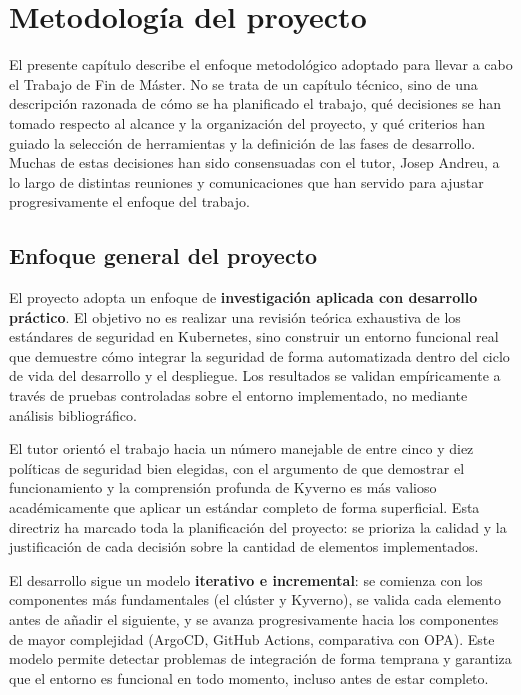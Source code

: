 \chapter{Metodología del proyecto}

El presente capítulo describe el enfoque metodológico adoptado para llevar a cabo el Trabajo de Fin de Máster. No se trata de un capítulo técnico, sino de una descripción razonada de cómo se ha planificado el trabajo, qué decisiones se han tomado respecto al alcance y la organización del proyecto, y qué criterios han guiado la selección de herramientas y la definición de las fases de desarrollo. Muchas de estas decisiones han sido consensuadas con el tutor, Josep Andreu, a lo largo de distintas reuniones y comunicaciones que han servido para ajustar progresivamente el enfoque del trabajo.

\section{Enfoque general del proyecto}

El proyecto adopta un enfoque de \textbf{investigación aplicada con desarrollo práctico}. El objetivo no es realizar una revisión teórica exhaustiva de los estándares de seguridad en Kubernetes, sino construir un entorno funcional real que demuestre cómo integrar la seguridad de forma automatizada dentro del ciclo de vida del desarrollo y el despliegue. Los resultados se validan empíricamente a través de pruebas controladas sobre el entorno implementado, no mediante análisis bibliográfico.

El tutor orientó el trabajo hacia un número manejable de entre cinco y diez políticas de seguridad bien elegidas, con el argumento de que demostrar el funcionamiento y la comprensión profunda de Kyverno es más valioso académicamente que aplicar un estándar completo de forma superficial. Esta directriz ha marcado toda la planificación del proyecto: se prioriza la calidad y la justificación de cada decisión sobre la cantidad de elementos implementados.

El desarrollo sigue un modelo \textbf{iterativo e incremental}: se comienza con los componentes más fundamentales (el clúster y Kyverno), se valida cada elemento antes de añadir el siguiente, y se avanza progresivamente hacia los componentes de mayor complejidad (ArgoCD, GitHub Actions, comparativa con OPA). Este modelo permite detectar problemas de integración de forma temprana y garantiza que el entorno es funcional en todo momento, incluso antes de estar completo.

